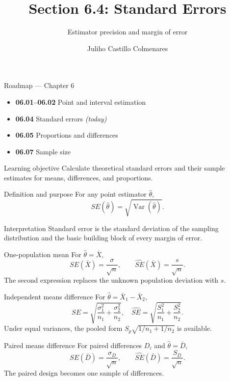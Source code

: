 \documentclass[10pt,aspectratio=169]{beamer}
\title[Standard Errors]{Section 6.4: Standard Errors}
\subtitle{Estimator precision and margin of error}
\author[J. Castillo Colmenares]{Juliho Castillo Colmenares}
\institute{Tecnológico de Monterrey}
\date{}
\begin{document}
\begin{frame}[plain]\vspace{-0.8cm}\titlepage\end{frame}

\begin{frame}{Roadmap --- Chapter 6}
  \footnotesize
  \begin{itemize}\itemsep=0.08cm
    \item \textbf{06.01--06.02} Point and interval estimation
    \item \textbf{06.04} Standard errors \emph{(today)}
    \item \textbf{06.05} Proportions and differences
    \item \textbf{06.07} Sample size
  \end{itemize}
  \begin{block}{Learning objective}
    Calculate theoretical standard errors and their sample estimates for means,
    differences, and proportions.
  \end{block}
\end{frame}

\begin{frame}{Definition and purpose}
  \footnotesize
  For any point estimator $\hat\theta$,
  \[
    SE(\hat\theta)=\sqrt{\operatorname{Var}(\hat\theta)}.
  \]
  \begin{alertblock}{Interpretation}
    Standard error is the standard deviation of the sampling distribution and
    the basic building block of every margin of error.
  \end{alertblock}
\end{frame}

\begin{frame}{One-population mean}
  \footnotesize
  For $\hat\theta=\bar X$,
  \[
    SE(\bar X)=\frac{\sigma}{\sqrt n},
    \qquad \widehat{SE}(\bar X)=\frac{s}{\sqrt n}.
  \]
  The second expression replaces the unknown population deviation with $s$.
\end{frame}

\begin{frame}{Independent means difference}
  \footnotesize
  For $\hat\theta=\bar X_1-\bar X_2$,
  \[
    SE=\sqrt{\frac{\sigma_1^2}{n_1}+\frac{\sigma_2^2}{n_2}},
    \quad
    \widehat{SE}=\sqrt{\frac{S_1^2}{n_1}+\frac{S_2^2}{n_2}}.
  \]
  Under equal variances, the pooled form $S_p\sqrt{1/n_1+1/n_2}$ is available.
\end{frame}

\begin{frame}{Paired means difference}
  \footnotesize
  For paired differences $D_i$ and $\hat\theta=\bar D$,
  \[
    SE(\bar D)=\frac{\sigma_D}{\sqrt n},
    \qquad \widehat{SE}(\bar D)=\frac{S_D}{\sqrt n}.
  \]
  The paired design becomes one sample of differences.
\end{frame}
\end{document}
